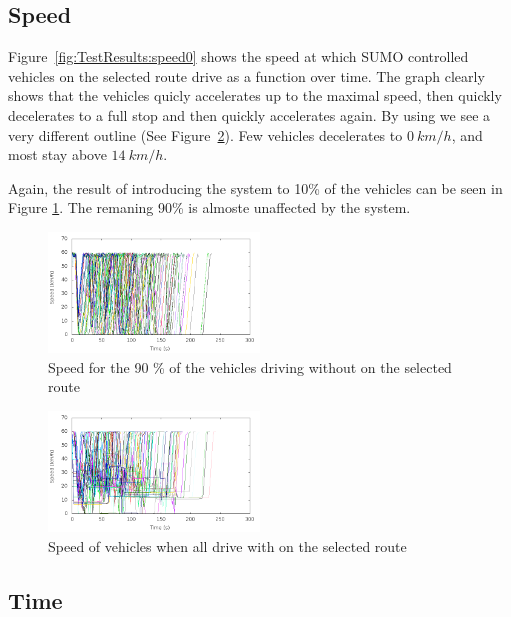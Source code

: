 \subsection{Speed}
Figure~\ref{fig:TestResults:speed0} shows the speed at which SUMO controlled vehicles on the selected route drive as a function over time.
The graph clearly shows that the vehicles quicly accelerates up to the maximal speed, then quickly decelerates to a full stop and then quickly accelerates again.
By using \tech we see a very different outline (See Figure~\ref{fig:TestResults:speed100}).
Few vehicles decelerates to $0\ km/h$, and most stay above $14\ km/h$.

Again, the result of introducing the system to 10\% of the vehicles can be seen in Figure \ref{fig:TestResults:speedUnC10}. 
The remaning 90\% is almoste unaffected by the system.

\begin{figure}[H]
\includegraphics[width=0.5\textwidth]{images/tp0/speedUncontrolled10.png}
\caption{Speed for the 90 \% of the vehicles driving without \tech on the selected route}
\label{fig:TestResults:speedUnC10}
\end{figure}

\begin{figure}[H]
\includegraphics[width=0.5\textwidth]{images/tp0/speedControlled100.png}
\caption{Speed of vehicles when all drive with \tech on the selected route}
\label{fig:TestResults:speed100}
\end{figure}


\subsection{Time}

